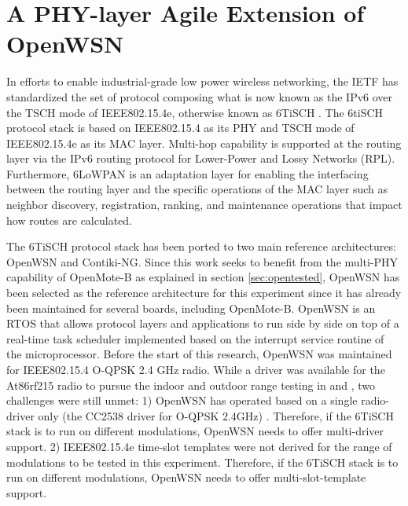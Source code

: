 \documentclass[journal]{IEEEtran}
\newcommand{\oqpsk}        {O-QPSK 2.4GHz}
\begin{document}
\section{A PHY-layer Agile Extension of OpenWSN}
\label{sec:openwsn}


In efforts to enable industrial-grade low power wireless networking, the IETF has standardized the set of protocol composing what is now known as the IPv6 over the TSCH mode of IEEE802.15.4e, otherwise known as 6TiSCH \cite{vilajosana21ietf}.
The 6tiSCH protocol stack is based on IEEE802.15.4 as its PHY and TSCH mode of IEEE802.15.4e as its MAC layer.
Multi-hop capability is supported at the routing layer via the IPv6 routing protocol for Lower-Power and Lossy Networks (RPL). 
Furthermore, 6LoWPAN is an adaptation layer for enabling the interfacing between the routing layer and the specific operations of the MAC layer such as neighbor discovery, registration, ranking, and maintenance operations that impact how routes are calculated. 


The 6TiSCH protocol stack has been ported to two main reference architectures: OpenWSN and Contiki-NG. 
Since this work seeks to benefit from the multi-PHY capability of OpenMote-B as explained in section \ref{sec:opentested}, OpenWSN has been selected as the reference architecture for this experiment since it has already been maintained for several boards, including OpenMote-B. 
OpenWSN is an RTOS that allows protocol layers and applications to run side by side on top of a real-time task scheduler implemented based on the interrupt service routine of the microprocessor.
Before the start of this research, OpenWSN was maintained for IEEE802.15.4 O-QPSK 2.4 GHz radio. 
While a driver was available for the At86rf215 radio to pursue the indoor and outdoor range testing in \cite{munoz18evaluationa} and \cite{munoz18overview}, two challenges were still unmet: 
1) OpenWSN has operated based on a single radio-driver only (the CC2538 driver for \oqpsk) . Therefore, if the 6TiSCH stack is to run on different modulations, OpenWSN needs to offer multi-driver support.
2) IEEE802.15.4e time-slot templates were not derived for the range of modulations to be tested in this experiment.  Therefore, if the 6TiSCH stack is to run on different modulations, OpenWSN needs to offer multi-slot-template support.
\end{document}
